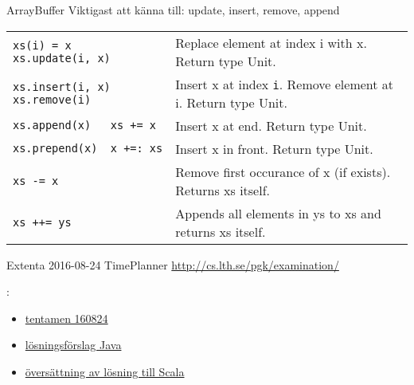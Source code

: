 \begin{Slide}{ArrayBuffer}
Viktigast att känna till: update, insert, remove, append
{\SlideFontTiny

\vspace{2.5em}\begin{tabular}{@{}p{4.2cm}  p{6.5cm}}
\texttt{xs(i) = x \newline xs.update(i, x)} & Replace element at index i with x. \newline Return type Unit.\\   \cline{1-2}

\texttt{xs.insert(i, x)\newline xs.remove(i)} & Insert x at index \texttt{i}. Remove element at i. \newline Return type Unit.\\   \cline{1-2}

\texttt{xs.append(x)~~~xs~+=~x} & Insert x at end.  Return type Unit.\\   \cline{1-2}

\texttt{xs.prepend(x)~~x~+=:~xs} & Insert x in front.  Return type Unit.\\   \cline{1-2}

\texttt{xs -= x} & Remove first occurance of x (if exists). \newline Returns xs itself. \\\cline{1-2}

\texttt{xs ++= ys} & Appends all elements in ys to xs and returns xs itself. \\

\end{tabular}
}
\end{Slide}



\begin{Slide}{Extenta 2016-08-24 TimePlanner}\SlideFontSmall
\url{http://cs.lth.se/pgk/examination/}

\vspace{1em}: 
\begin{itemize}
\item \href{http://fileadmin.cs.lth.se/cs//Education/grundkurs/extentor/160824.pdf}{tentamen 160824} 
\item \href{http://fileadmin.cs.lth.se/cs//Education/grundkurs/extentor/sol-160824.pdf}{lösningsförslag Java} 
\item \href{https://github.com/lunduniversity/introprog/tree/master/compendium/examples/exam/re-impl-java-exams/timeplanner-160824}{översättning av lösning till Scala}
\end{itemize}
\end{Slide}



